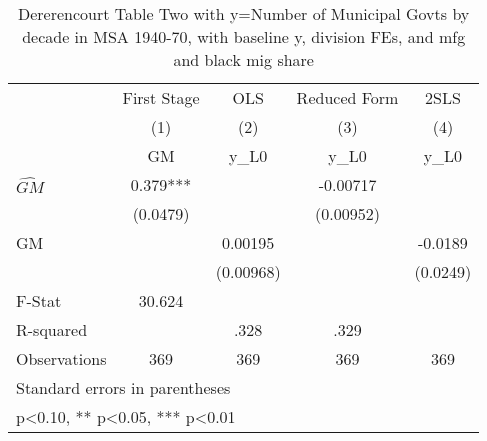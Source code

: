 \begin{table}[htbp]\centering
\def\sym#1{\ifmmode^{#1}\else\(^{#1}\)\fi}
\caption{Dererencourt Table Two with y=Number of Municipal Govts by decade in MSA 1940-70, with baseline y, division FEs, and mfg and black mig share}
\begin{tabular}{l*{4}{c}}
\toprule
                    & First Stage   &         OLS   &Reduced Form   &        2SLS   \\
                    &\multicolumn{1}{c}{(1)}&\multicolumn{1}{c}{(2)}&\multicolumn{1}{c}{(3)}&\multicolumn{1}{c}{(4)}\\
                    &\multicolumn{1}{c}{GM}&\multicolumn{1}{c}{y\_L0}&\multicolumn{1}{c}{y\_L0}&\multicolumn{1}{c}{y\_L0}\\
\midrule
$\hat{GM}$          &       0.379***&               &    -0.00717   &               \\
                    &    (0.0479)   &               &   (0.00952)   &               \\
\addlinespace
GM                  &               &     0.00195   &               &     -0.0189   \\
                    &               &   (0.00968)   &               &    (0.0249)   \\
\midrule
F-Stat              &      30.624   &               &               &               \\
R-squared           &               &        .328   &        .329   &               \\
Observations        &         369   &         369   &         369   &         369   \\
\bottomrule
\multicolumn{5}{l}{\footnotesize Standard errors in parentheses}\\
\multicolumn{5}{l}{\footnotesize * p<0.10, ** p<0.05, *** p<0.01}\\
\end{tabular}
\end{table}
